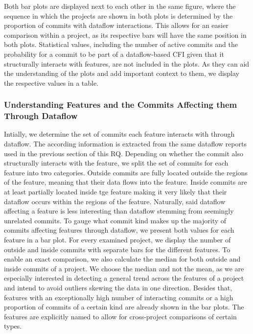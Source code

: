 Both bar plots are displayed next to each other in the same figure, where the sequence in which the projects are shown in both plots is determined by the proportion of commits with dataflow interactions.
This allows for an easier comparison within a project, as its respective bars will have the same position in both plots.
Statistical values, including the number of active commits and the probability for a commit to be part of a dataflow-based CFI given that it structurally interacts with features, are not included in the plots.
As they can aid the understanding of the plots and add important context to them, we display the respective values in a table.

\subsubsection*{Understanding Features and the Commits Affecting them Through Dataflow}

Intially, we determine the set of commits each feature interacts with through dataflow.
The according information is extracted from the same dataflow reports used in the previous section of this RQ.
Depending on whether the commit also structurally interacts with the feature, we split the set of commits for each feature into two categories.
Outside commits are fully located outside the regions of the feature, meaning that their data flows into the feature.
Inside commits are at least partially located inside tge feature making it very likely that their dataflow occurs within the regions of the feature.
Naturally, said dataflow affecting a feature is less interesting than dataflow stemming from seemingly unrelated commits.
To gauge what commit kind makes up the majority of commits affecting features through dataflow, we present both values for each feature in a bar plot.
For every examined project, we display the number of outside and inside commits with separate bars for the different features.
To enable an exact comparison, we also calculate the median for both outside and inside commits of a project.
We choose the median and not the mean, as we are especially interested in detecting a general trend across the features of a project and intend to avoid outliers skewing the data in one direction.
Besides that, features with an exceptionally high number of interacting commits or a high proportion of commits of a certain kind are already shown in the bar plots.
The features are explicitly named to allow for cross-project comparisons of certain types.

